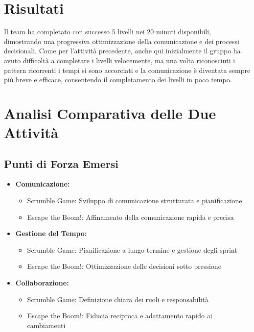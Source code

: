 \documentclass{article}
\begin{document}
\section*{Risultati}
Il team ha completato con successo 5 livelli nei 20 minuti disponibili, dimostrando una progressiva ottimizzazione della comunicazione e dei processi decisionali.
Come per l'attività precedente, anche qui inizialmente il gruppo ha avuto difficoltà a completare i livelli velocemente, ma una volta riconosciuti i pattern ricorrenti i tempi si sono accorciati e la comunicazione è diventata sempre più breve e efficace, consentendo il completamento dei livelli in poco tempo.

\section*{Analisi Comparativa delle Due Attività}

\subsection*{Punti di Forza Emersi}
\begin{itemize}
    \item \textbf{Comunicazione:}
    \begin{itemize}
        \item Scrumble Game: Sviluppo di comunicazione strutturata e pianificazione
        \item Escape the Boom!: Affinamento della comunicazione rapida e precisa
    \end{itemize}
    
    \item \textbf{Gestione del Tempo:}
    \begin{itemize}
        \item Scrumble Game: Pianificazione a lungo termine e gestione degli sprint
        \item Escape the Boom!: Ottimizzazione delle decisioni sotto pressione
    \end{itemize}
    
    \item \textbf{Collaborazione:}
    \begin{itemize}
        \item Scrumble Game: Definizione chiara dei ruoli e responsabilità
        \item Escape the Boom!: Fiducia reciproca e adattamento rapido ai cambiamenti
    \end{itemize}
\end{itemize}
\end{document}
